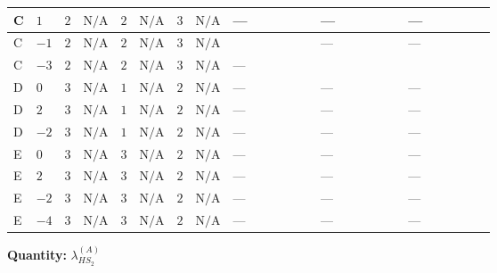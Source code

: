 \documentclass[8pt]{article}
\begin{document}
\begin{landscape}
\begin{longtable}{@{}llcccccc >{\raggedright\arraybackslash}p{0.21\linewidth} >{\raggedright\arraybackslash}p{0.21\linewidth} >{\raggedright\arraybackslash}p{0.21\linewidth}@{}}
\midrule
C & $1$ & $2$ & $\text{N/A}$ & $2$ & $\text{N/A}$ & $3$ & $\text{N/A}$ & --- & --- & --- \\
\midrule
C & $-1$ & $2$ & $\text{N/A}$ & $2$ & $\text{N/A}$ & $3$ & $\text{N/A}$ & \scriptsize\adjustbox{max width=\linewidth}{$\begin{gathered} +{\lambda_{X_{17}}^{(1)}} (8 \left({\lambda_{X_{17}}^{(1)}}\right)^{*}-4 \left({\lambda_{10}}\right)^{*})\end{gathered}$} & --- & --- \\
\midrule
C & $-3$ & $2$ & $\text{N/A}$ & $2$ & $\text{N/A}$ & $3$ & $\text{N/A}$ & --- & \scriptsize\adjustbox{max width=\linewidth}{$\begin{gathered} -64 {\lambda_{X_{10}}} \left({\lambda_{X_{10}}}\right)^{*}\end{gathered}$} & \scriptsize\adjustbox{max width=\linewidth}{$\begin{gathered} +{g_1}^2 \left(-6 {g_2}^2-3 {\lambda_{HS_2}^{(A)}}\right)\end{gathered}$} \\
\midrule
D & $0$ & $3$ & $\text{N/A}$ & $1$ & $\text{N/A}$ & $2$ & $\text{N/A}$ & --- & --- & --- \\
\midrule
D & $2$ & $3$ & $\text{N/A}$ & $1$ & $\text{N/A}$ & $2$ & $\text{N/A}$ & --- & --- & --- \\
\midrule
D & $-2$ & $3$ & $\text{N/A}$ & $1$ & $\text{N/A}$ & $2$ & $\text{N/A}$ & --- & --- & --- \\
\midrule
E & $0$ & $3$ & $\text{N/A}$ & $3$ & $\text{N/A}$ & $2$ & $\text{N/A}$ & --- & --- & --- \\
\midrule
E & $2$ & $3$ & $\text{N/A}$ & $3$ & $\text{N/A}$ & $2$ & $\text{N/A}$ & --- & --- & --- \\
\midrule
E & $-2$ & $3$ & $\text{N/A}$ & $3$ & $\text{N/A}$ & $2$ & $\text{N/A}$ & --- & --- & --- \\
\midrule
E & $-4$ & $3$ & $\text{N/A}$ & $3$ & $\text{N/A}$ & $2$ & $\text{N/A}$ & --- & --- & --- \\
\midrule
\bottomrule
\end{longtable}
\clearpage
\noindent\textbf{Quantity: }$\lambda_{HS_2}^{(A)}$\par\smallskip

\end{landscape}
\end{document}

